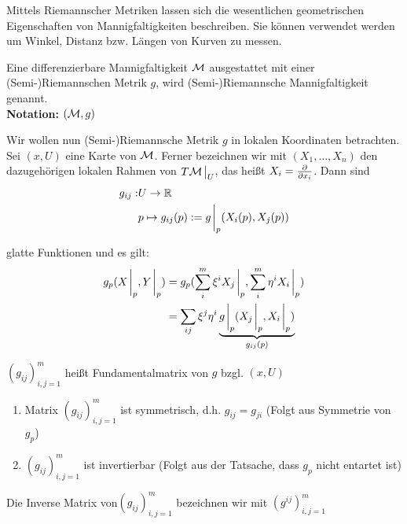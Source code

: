 
Mittels Riemannscher Metriken lassen sich die wesentlichen geometrischen Eigenschaften von Mannigfaltigkeiten beschreiben.
Sie können verwendet werden um Winkel, Distanz bzw. Längen von Kurven zu messen.

\begin{defs}
Eine differenzierbare Mannigfaltigkeit $\mathcal{M}$ ausgestattet mit einer (Semi-)Riemannschen Metrik $g$, wird (Semi-)Riemannsche Mannigfaltigkeit genannt.\\
\textbf{Notation:} $(\mathcal{M}, g)$
\end{defs}

Wir wollen nun (Semi-)Riemannsche Metrik $g$ in lokalen Koordinaten betrachten.
Sei $(x, U)$ eine Karte von $\mathcal{M}$.
Ferner bezeichnen wir mit $(X_1, \dots, X_n)$ den dazugehörigen lokalen Rahmen von $T\mfk \eval_U$,
das heißt $X_i = \pdv{x_i}$.
Dann sind 
\begin{align}
g_{ij}: &U \to \R \\
& p \mapsto g_{ij} (p) := g\eval_p (X_i (p), X_j (p))
\end{align}

glatte Funktionen und es gilt:
\begin{align}
g_p (X\eval_p, Y \eval_p) &= g_p ( \sum_i^m \xi^i X_j \eval_p, \sum_i^m \eta^i X_i \eval_p)\\
&= \sum_{ij} \xi^j \eta^i \underbrace{g\eval_p (X_j \eval_p, X_i \eval_p)}_{g_{ij}(p)}
\end{align}

\begin{defs}[Fundamentalmatrix]
$(g_{ij})^m_{i, j = 1}$ heißt Fundamentalmatrix von $g$ bzgl. $(x, U)$
\end{defs}

\begin{bem}

\begin{enumerate}
\item Matrix $(g_{ij})^m_{i, j = 1}$ ist symmetrisch, d.h. $g_{ij} = g_{ji}$ (Folgt aus Symmetrie von $g_p$)
\item $(g_{ij})^m_{i, j = 1}$ ist invertierbar (Folgt aus der Tatsache, dass $g_p$ nicht entartet ist)
\end{enumerate}
Die Inverse Matrix von$(g_{ij})^m_{i, j = 1}$ bezeichnen wir mit $(g^{ij})^m_{i, j = 1}$
\end{bem}

